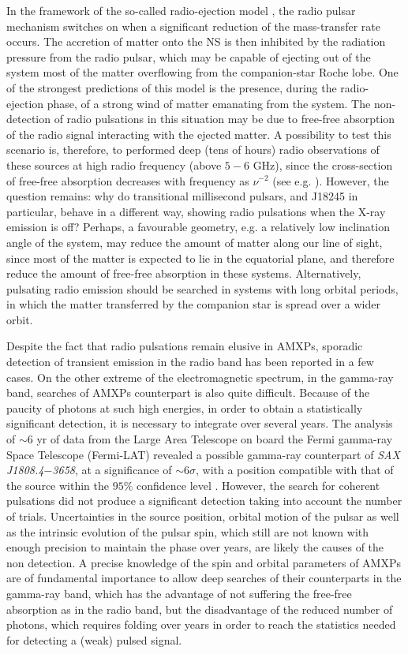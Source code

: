 \documentclass[graybox]{svmult}
\def \saxj{{\em SAX J1808.4$-$3658\xspace}}
\begin{document}
In the framework of the so-called radio-ejection model \cite{Burderi2001}, the radio pulsar mechanism switches on when a significant reduction of the mass-transfer rate occurs. The accretion of matter onto the NS is then inhibited by the radiation pressure from the radio pulsar, which may be capable of ejecting out of the system most of the matter overflowing from the companion-star Roche lobe. One of the strongest predictions of this model is the presence, during the radio-ejection phase, of a strong wind of matter emanating from the system. The non-detection of radio pulsations in this situation may be due to free-free absorption of the radio signal interacting with the ejected matter. A possibility to test this scenario is, therefore, to performed deep (tens of hours) radio observations of these sources at high radio frequency (above $5-6$ GHz), since the cross-section of free-free absorption decreases with frequency as $\nu^{-2}$ (see e.g. \cite{Iacolina2009,Iacolina2010}). However, the question remains: why do transitional millisecond pulsars, and J18245 in particular, behave in a different way, showing radio pulsations when the X-ray emission is off? Perhaps, a favourable geometry, e.g. a relatively low inclination angle of the system, may reduce the amount of matter along our line of sight, since most of the matter is expected to lie in the equatorial plane, and therefore reduce the amount of free-free absorption in these systems. Alternatively, pulsating radio emission should be searched in systems with long orbital periods, in which the matter transferred by the companion star is spread over a wider orbit. 

Despite the fact that radio pulsations remain elusive in AMXPs, sporadic detection of transient emission in the radio band has been reported in a few cases. On the other extreme of the electromagnetic spectrum, in the gamma-ray band, searches of AMXPs counterpart is also quite difficult. Because of the paucity of photons at such high energies, in order to obtain a statistically significant detection, it is necessary to integrate over several years. The analysis of $\sim 6$ yr of data from the Large Area Telescope on board the Fermi gamma-ray Space Telescope (Fermi-LAT) revealed a possible gamma-ray counterpart of \saxj{}, at a significance of $\sim 6 \sigma$, with a position compatible with that of the source within the $95\%$ confidence level \cite{deOnaWilhelmi2016}. However, the search for coherent pulsations did not produce a significant detection taking into account the number of trials. Uncertainties in the source position, orbital motion of the pulsar as well as the intrinsic evolution of the pulsar spin, which still are not known with enough precision to maintain the phase over years, are likely the causes of the non detection. A precise knowledge of the spin and orbital parameters of AMXPs are of fundamental importance to allow deep searches of their counterparts in the gamma-ray band, which has the advantage of not suffering the free-free absorption as in the radio band, but the disadvantage of the reduced number of photons, which requires folding over years in order to reach the statistics needed for detecting a (weak) pulsed signal. 
\end{document}
